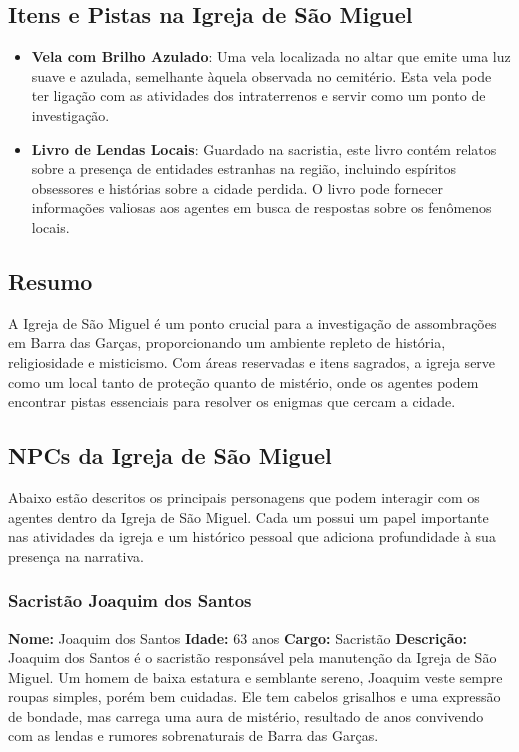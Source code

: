 \subsection{Itens e Pistas na Igreja de São Miguel}

\begin{itemize}
    \item \textbf{Vela com Brilho Azulado}: Uma vela localizada no altar que emite uma luz suave e azulada, semelhante àquela observada no cemitério. Esta vela pode ter ligação com as atividades dos intraterrenos e servir como um ponto de investigação.
    \item \textbf{Livro de Lendas Locais}: Guardado na sacristia, este livro contém relatos sobre a presença de entidades estranhas na região, incluindo espíritos obsessores e histórias sobre a cidade perdida. O livro pode fornecer informações valiosas aos agentes em busca de respostas sobre os fenômenos locais.
\end{itemize}

\subsection{Resumo}

A Igreja de São Miguel é um ponto crucial para a investigação de assombrações em Barra das Garças, proporcionando um ambiente repleto de história, religiosidade e misticismo. Com áreas reservadas e itens sagrados, a igreja serve como um local tanto de proteção quanto de mistério, onde os agentes podem encontrar pistas essenciais para resolver os enigmas que cercam a cidade.


\subsection{NPCs da Igreja de São Miguel}

Abaixo estão descritos os principais personagens que podem interagir com os agentes dentro da Igreja de São Miguel. Cada um possui um papel importante nas atividades da igreja e um histórico pessoal que adiciona profundidade à sua presença na narrativa.

\subsubsection{Sacristão Joaquim dos Santos}

\textbf{Nome:} Joaquim dos Santos  
\textbf{Idade:} 63 anos  
\textbf{Cargo:} Sacristão  
\textbf{Descrição:}  
Joaquim dos Santos é o sacristão responsável pela manutenção da Igreja de São Miguel. Um homem de baixa estatura e semblante sereno, Joaquim veste sempre roupas simples, porém bem cuidadas. Ele tem cabelos grisalhos e uma expressão de bondade, mas carrega uma aura de mistério, resultado de anos convivendo com as lendas e rumores sobrenaturais de Barra das Garças. 

